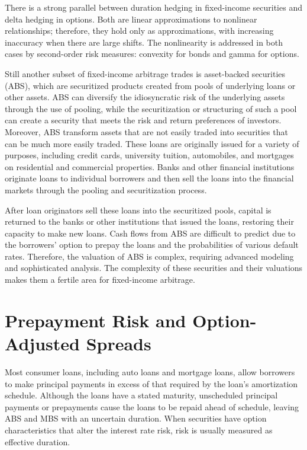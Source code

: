 \documentclass[11pt]{article}
\begin{document}
There is a strong parallel between duration hedging in fixed-income securities and delta hedging in options. Both are linear approximations to nonlinear relationships; therefore, they hold only as approximations, with increasing inaccuracy when there are large shifts. The nonlinearity is addressed in both cases by second-order risk measures: convexity for bonds and gamma for options.

Still another subset of fixed-income arbitrage trades is asset-backed securities (ABS), which are securitized products created from pools of underlying loans or other assets. ABS can diversify the idiosyncratic risk of the underlying assets through the use of pooling, while the securitization or structuring of such a pool can create a security that meets the risk and return preferences of investors. Moreover, ABS transform assets that are not easily traded into securities that can be much more easily traded. These loans are originally issued for a variety of purposes, including credit cards, university tuition, automobiles, and mortgages on residential and commercial properties. Banks and other financial institutions originate loans to individual borrowers and then sell the loans into the financial markets through the pooling and securitization process.

After loan originators sell these loans into the securitized pools, capital is returned to the banks or other institutions that issued the loans, restoring their capacity to make new loans. Cash flows from ABS are difficult to predict due to the borrowers' option to prepay the loans and the probabilities of various default rates. Therefore, the valuation of ABS is complex, requiring advanced modeling and sophisticated analysis. The complexity of these securities and their valuations makes them a fertile area for fixed-income arbitrage.

\section*{Prepayment Risk and Option-Adjusted Spreads}
Most consumer loans, including auto loans and mortgage loans, allow borrowers to make principal payments in excess of that required by the loan's amortization schedule. Although the loans have a stated maturity, unscheduled principal payments or prepayments cause the loans to be repaid ahead of schedule, leaving ABS and MBS with an uncertain duration. When securities have option characteristics that alter the interest rate risk, risk is usually measured as effective duration.
\end{document}

